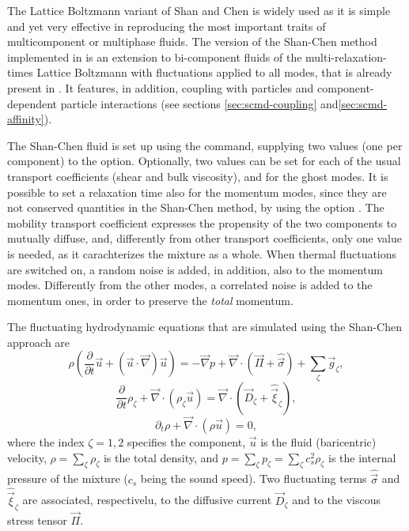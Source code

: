 The Lattice Boltzmann variant of Shan and Chen\cite{shan93a} is widely
used as it is simple and yet very effective in reproducing the most
important traits of multicomponent or multiphase fluids. The version
of the Shan-Chen method implemented in \es is an extension to
bi-component fluids of the multi-relaxation-times Lattice Boltzmann
with fluctuations applied to all modes, that is already present in
\es. It features, in addition, coupling with particles\cite{sega13c}
and component-dependent particle interactions (see sections
\ref{sec:scmd-coupling} and\ref{sec:scmd-affinity}).

The Shan-Chen fluid is set up using the  command,
supplying two values (one per component) to the  option. Optionally, two values can be set for each of the usual transport coefficients  (shear and bulk viscosity), and for the ghost modes. It
is possible to set a relaxation time also for the momentum modes,
since they are not conserved quantities in the Shan-Chen method,
by using the option . The mobility transport coefficient
expresses the propensity of the two components to mutually diffuse,
and, differently from other transport coefficients, only one value
is needed, as it carachterizes the mixture as a whole. When thermal
fluctuations are switched on, a random noise is added, in addition,
also to the momentum modes. Differently from the other modes, a
correlated noise is added to the momentum ones, in order to preserve
the \emph{total} momentum. 


The fluctuating hydrodynamic equations that are simulated using the
Shan-Chen approach are
\begin{equation}\label{eq:shanchen-NS}
\rho \left(\frac{\partial }{\partial  t} {\vec {u}} + ({\vec {u}}\cdot {\vec {\nabla}})  {\vec {u}} \right)=-{\vec {\nabla}} p+{\vec {\nabla}} \cdot ({\vec {\Pi}}+\hat{{\vec {\sigma}}})+\sum_{\zeta} {\vec {g}}_{\zeta},
\end{equation}
\begin{equation}\label{eq:shanchen-cont}
\frac{\partial }{\partial  t} \rho_{\zeta}+{\vec {\nabla}} \cdot (\rho_{\zeta} {\vec {u}}) = {\vec {\nabla}} \cdot  ({\vec {D}}_{\zeta}+\hat{{\vec {\xi}}}_{\zeta}),
\end{equation}
\begin{equation}\label{eq:shanchen-globalcont}
\partial_t \rho+{\vec {\nabla}} \cdot (\rho {\vec {u}}) = 0,
\end{equation}
where the index $\zeta=1,2$ specifies the component, $\vec{u}$ is
the fluid (baricentric) velocity, $\rho=\sum_\zeta\rho_\zeta$ is
the total density, and $p=\sum_{\zeta} p_{\zeta}=\sum_{\zeta} c_s^2
\rho_{\zeta}$ is the internal pressure of the mixture ($c_s$ being
the sound speed). Two fluctuating terms $\hat{{\vec{\sigma}}}$ and
$\hat{{\vec{\xi}}}_{\zeta}$ are associated, respectivelu, to the
diffusive current ${\vec{D}}_{\zeta}$ and to the viscous stress
tensor ${\vec{\Pi}}$.

